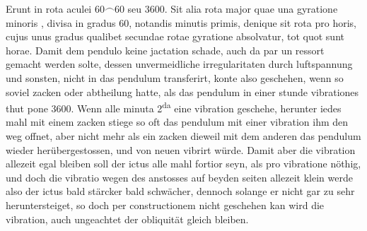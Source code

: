             Erunt  in rota aculei $60 \smallfrown 60$ seu 3600.  
            Sit alia rota major quae una gyratione minoris , divisa in gradus 60, notandis minutis primis, denique  sit rota pro horis, cujus unus gradus qualibet  secundae rotae gyratione absolvatur, tot quot  sunt horae.\pend 
            \pstart  Damit dem pendulo\protect{} keine jactation  schade, auch da  par un ressort  ge\-macht werden solte, dessen unvermeidliche irregularitaten durch luftspannung\protect{}  und sonsten, nicht in das pendulum\protect{} transferirt, konte also geschehen, wenn  so soviel zacken oder abtheilung  hatte, als das pendulum in einer stunde vibrationes thut  pone 3600. Wenn alle minuta 2\textsuperscript{da} eine vibration  geschehe, herunter iedes mahl mit einem zacken stiege so oft das pendulum\protect{} mit einer vibration ihm den  weg offnet, aber nicht mehr als ein zacken dieweil  mit dem anderen das pendulum\protect{} wieder her\"{u}bergestossen, und von neuen vibrirt w\"{u}rde. Damit aber  die vibration allezeit egal bleiben soll der  ictus alle mahl fortior seyn, als pro vibratione  n\"{o}thig, und doch die vibratio wegen des anstosses  auf beyden seiten allezeit klein  werde also der ictus bald st\"{a}rcker bald  schw\"{a}cher, dennoch solange er nicht gar  zu sehr heruntersteiget, so doch per constructionem nicht geschehen kan wird die vibration, auch ungeachtet der obliquit\"{a}t gleich bleiben.  \pend 
 


 


 


 


 


 


 


 


 


 

